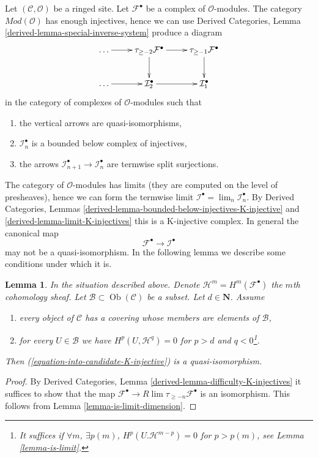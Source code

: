 \documentclass[10pt,a4paper]{amsart}
\theoremstyle{plain}
\newtheorem{lemma}[subsection]{Lemma}
\theoremstyle{definition}
\theoremstyle{remark}
\numberwithin{equation}{subsection}
\def\lim{\mathop{\mathrm{lim}}\nolimits}
\def\Ob{\mathop{\mathrm{Ob}}\nolimits}
\begin{document}
\noindent
Let $(\mathcal{C}, \mathcal{O})$ be a ringed site.
Let $\mathcal{F}^\bullet$ be a complex of $\mathcal{O}$-modules.
The category $\textit{Mod}(\mathcal{O})$ has enough injectives, hence
we can use
Derived Categories, Lemma \ref{derived-lemma-special-inverse-system}
produce a diagram
$$
\xymatrix{
\ldots \ar[r] &
\tau_{\geq -2}\mathcal{F}^\bullet \ar[r] \ar[d] &
\tau_{\geq -1}\mathcal{F}^\bullet \ar[d] \\
\ldots \ar[r] & \mathcal{I}_2^\bullet \ar[r] & \mathcal{I}_1^\bullet
}
$$
in the category of complexes of $\mathcal{O}$-modules such that
\begin{enumerate}
\item the vertical arrows are quasi-isomorphisms,
\item $\mathcal{I}_n^\bullet$ is a bounded below complex of injectives,
\item the arrows $\mathcal{I}_{n + 1}^\bullet \to \mathcal{I}_n^\bullet$
are termwise split surjections.
\end{enumerate}
The category of $\mathcal{O}$-modules has limits (they are computed
on the level of presheaves), hence we can form the termwise limit
$\mathcal{I}^\bullet = \lim_n \mathcal{I}_n^\bullet$. By
Derived Categories, Lemmas
\ref{derived-lemma-bounded-below-injectives-K-injective} and
\ref{derived-lemma-limit-K-injectives}
this is a K-injective complex. In general the canonical map
\begin{equation}
\label{equation-into-candidate-K-injective}
\mathcal{F}^\bullet \to \mathcal{I}^\bullet
\end{equation}
may not be a quasi-isomorphism. In the following lemma we describe some
conditions under which it is.


\begin{lemma}
\label{lemma-K-injective}
In the situation described above. Denote
$\mathcal{H}^m = H^m(\mathcal{F}^\bullet)$ the $m$th cohomology sheaf.
Let $\mathcal{B} \subset \Ob(\mathcal{C})$ be a subset.
Let $d \in \mathbf{N}$.
Assume
\begin{enumerate}
\item every object of $\mathcal{C}$ has a covering whose members are
elements of $\mathcal{B}$,
\item for every $U \in \mathcal{B}$ we have $H^p(U, \mathcal{H}^q) = 0$
for $p > d$ and $q < 0$\footnote{It suffices if
$\forall m$, $\exists p(m)$, $H^p(U. \mathcal{H}^{m - p}) = 0$ for
$p > p(m)$, see Lemma \ref{lemma-is-limit}.}.
\end{enumerate}
Then (\ref{equation-into-candidate-K-injective}) is a quasi-isomorphism.
\end{lemma}

\begin{proof}
By Derived Categories, Lemma \ref{derived-lemma-difficulty-K-injectives}
it suffices to show that the map
$\mathcal{F}^\bullet \to R\lim \tau_{\geq -n} \mathcal{F}^\bullet$
is an isomorphism. This follows from Lemma \ref{lemma-is-limit-dimension}.
\end{proof}
\end{document}
